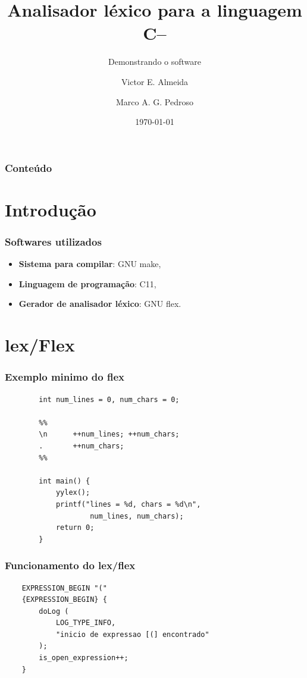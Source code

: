 \documentclass[12pt]{beamer}
\author[Grupo: c--]{Victor E. Almeida \and Marco A. G. Pedroso}
\title{Analisador léxico para a linguagem C--}
\subtitle{Demonstrando o software}
\date{\today}
\institute{UNIOESTE}
\begin{document}
\frame{\titlepage}

\begin{frame}
\frametitle{Conteúdo}
\tableofcontents
\end{frame}

\section{Introdução}\label{Introdução}
\begin{frame}
    \frametitle{Softwares utilizados}
    \begin{itemize}
        \item \textbf{Sistema para compilar}: GNU make,
        \item \textbf{Linguagem de programação}: C11,
        \item \textbf{Gerador de analisador léxico}: GNU flex.
    \end{itemize}
\end{frame}

\section{lex/Flex}\label{lex/Flex}

\begin{frame}[t,fragile]{\insertsectionhead}
    \frametitle{Exemplo minimo do flex}
    \begin{lstlisting}
        int num_lines = 0, num_chars = 0;

        %%
        \n      ++num_lines; ++num_chars;
        .       ++num_chars;
        %%

        int main() {
            yylex();
            printf("lines = %d, chars = %d\n",
                    num_lines, num_chars);
            return 0;
        }
    \end{lstlisting}
\end{frame}

\begin{frame}[t,fragile]{\insertsectionhead}
    \frametitle{Funcionamento do lex/flex}

    \begin{center}
        
    \begin{lstlisting}
    EXPRESSION_BEGIN "("
    {EXPRESSION_BEGIN} {
        doLog (
            LOG_TYPE_INFO,
            "inicio de expressao [(] encontrado"
        );
        is_open_expression++;
    }
    \end{lstlisting}
    \end{center}
    
\end{frame}
\end{document}
